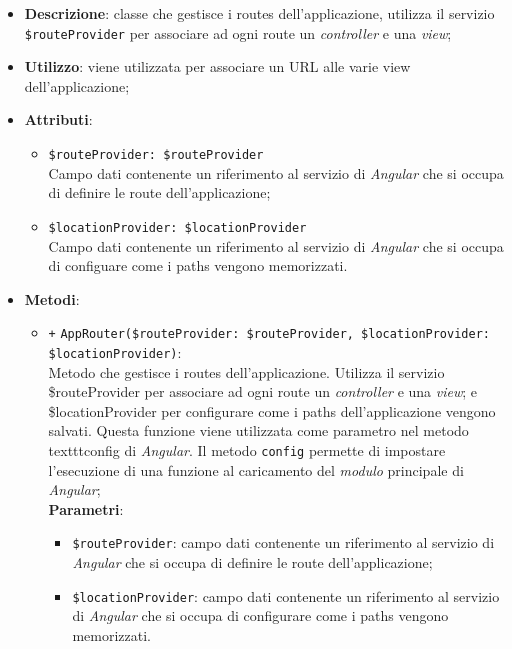 	\begin{itemize}
		\item \textbf{Descrizione}: classe che gestisce i routes dell’applicazione, utilizza il servizio \texttt{\$routeProvider} per associare ad ogni route un \textit{controller} e una \textit{view};
		\item \textbf{Utilizzo}: viene utilizzata per associare un URL alle varie view dell'applicazione;
		\item \textbf{Attributi}:
		\begin{itemize}
			\item \texttt{\$routeProvider: \$routeProvider}\\ Campo dati contenente un riferimento al servizio di \textit{Angular} che si occupa di definire le route dell'applicazione;
			\item \texttt{\$locationProvider: \$locationProvider}\\ Campo dati contenente un riferimento al servizio di \textit{Angular} che si occupa di configuare come i paths vengono memorizzati.
		\end{itemize}
		\item \textbf{Metodi}: 
		\begin{itemize}
			\item \texttt{+} \texttt{AppRouter(\$routeProvider: \$routeProvider, \$locationProvider: \$locationProvider)}: \\ Metodo che gestisce i routes dell'applicazione. Utilizza il servizio \$routeProvider per associare ad ogni route un \textit{controller} e una \textit{view}; e \$locationProvider per configurare come i paths dell'applicazione vengono salvati. Questa funzione viene utilizzata come parametro nel metodo texttt{config} di \textit{Angular}. Il metodo \texttt{config} permette di impostare l'esecuzione di una funzione al caricamento del \textit{modulo} principale di \textit{Angular};\\
			\textbf{Parametri}:
			\begin{itemize}
				\item \texttt{\$routeProvider}: campo dati contenente un riferimento al servizio di \textit{Angular} che si occupa di definire le route dell'applicazione;
				\item \texttt{\$locationProvider}: campo dati contenente un riferimento al servizio di \textit{Angular} che si occupa di configurare come i paths vengono memorizzati.
			\end{itemize}
		\end{itemize}
	\end{itemize}
	

